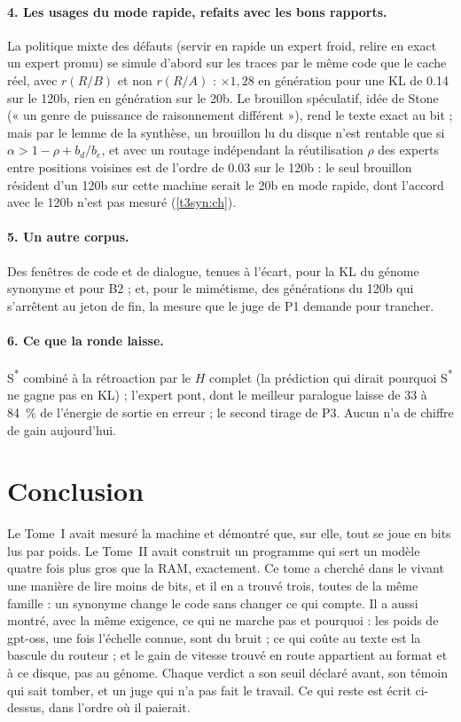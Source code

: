 \paragraph{4. Les usages du mode rapide, refaits avec les bons rapports.} La politique mixte des défauts (servir en rapide un expert froid, relire en exact un expert promu) se simule d'abord sur les traces par le même code que le cache réel, avec $r(R/B)$ et non $r(R/A)$ : $\times 1{,}28$ en génération pour une KL de \num{0.14} sur le 120b, rien en génération sur le 20b. Le brouillon spéculatif, idée de Stone (« un genre de puissance de raisonnement différent »), rend le texte exact au bit ; mais par le lemme de la synthèse, un brouillon lu du disque n'est rentable que si $\alpha > 1 - \rho + b_d/b_e$, et avec un routage indépendant la réutilisation $\rho$ des experts entre positions voisines est de l'ordre de \num{0.03} sur le 120b : le seul brouillon résident d'un 120b sur cette machine serait le 20b en mode rapide, dont l'accord avec le 120b n'est pas mesuré (\cref{t3syn:ch}).

\paragraph{5. Un autre corpus.} Des fenêtres de code et de dialogue, tenues à l'écart, pour la KL du génome synonyme et pour B2 ; et, pour le mimétisme, des générations du 120b qui s'arrêtent au jeton de fin, la mesure que le juge de P1 demande pour trancher.

\paragraph{6. Ce que la ronde laisse.} S\textsuperscript{*} combiné à la rétroaction par le $H$ complet (la prédiction qui dirait pourquoi S\textsuperscript{*} ne gagne pas en KL) ; l'expert pont, dont le meilleur paralogue laisse de 33 à \SI{84}{\percent} de l'énergie de sortie en erreur ; le second tirage de P3. Aucun n'a de chiffre de gain aujourd'hui.

\section*{Conclusion}\label{t3dis:sec:conclusion}

Le Tome~I avait mesuré la machine et démontré que, sur elle, tout se joue en bits lus par poids. Le Tome~II avait construit un programme qui sert un modèle quatre fois plus gros que la RAM, exactement. Ce tome a cherché dans le vivant une manière de lire moins de bits, et il en a trouvé trois, toutes de la même famille : un synonyme change le code sans changer ce qui compte. Il a aussi montré, avec la même exigence, ce qui ne marche pas et pourquoi : les poids de gpt-oss, une fois l'échelle connue, sont du bruit ; ce qui coûte au texte est la bascule du routeur ; et le gain de vitesse trouvé en route appartient au format et à ce disque, pas au génome. Chaque verdict a son seuil déclaré avant, son témoin qui sait tomber, et un juge qui n'a pas fait le travail. Ce qui reste est écrit ci-dessus, dans l'ordre où il paierait.
